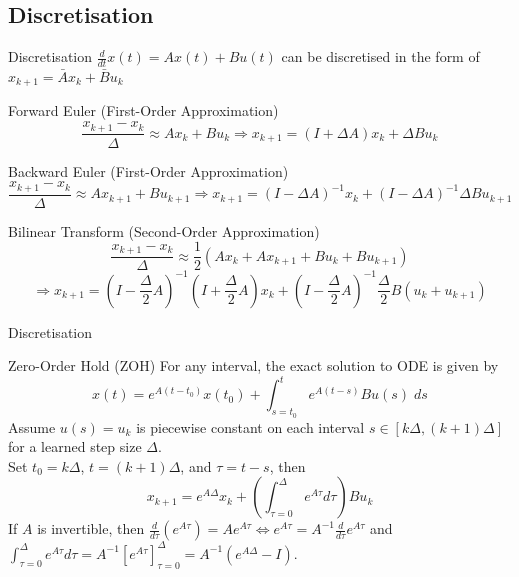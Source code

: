 \documentclass[xcolor=dvipsnames,aspectratio=169]{beamer}
\begin{document}
        \subsection{Discretisation}
            \begin{frame}{Discretisation}
                \small
                $\frac{d}{dt} x(t) = A x(t) + B u(t)$ can be discretised in the form of $x_{k + 1} = \bar{A} x_{k} + \bar{B} u_{k}$

                \begin{block}{Forward Euler (First-Order Approximation)} 
                    $$\frac{x_{k + 1} - x_{k}}{\Delta} \approx A x_{k} + B u_{k} \Rightarrow x_{k + 1} = (I + \Delta A) x_{k} + \Delta B u_{k}$$
                \end{block}

                \begin{block}{Backward Euler (First-Order Approximation)}
                    $$\frac{x_{k + 1} - x_{k}}{\Delta} \approx A x_{k + 1} + B u_{k + 1} \Rightarrow x_{k + 1} = (I - \Delta A)^{-1} x_{k} + (I - \Delta A)^{-1} \Delta B u_{k + 1}$$
                \end{block}

                \begin{block}{Bilinear Transform (Second-Order Approximation)} 
                    $$\frac{x_{k + 1} - x_{k}}{\Delta} \approx \frac{1}{2} (A x_{k} + A x_{k + 1} + B u_{k} + B u_{k + 1})$$
                    $$\Rightarrow x_{k+1} = (I - \frac{\Delta}{2} A)^{-1}(I + \frac{\Delta}{2} A) x_{k} + (I - \frac{\Delta}{2} A)^{-1} \frac{\Delta}{2} B (u_{k} + u_{k + 1})$$
                \end{block}
            \end{frame}

            \begin{frame}{Discretisation}
                \begin{block}{Zero-Order Hold (ZOH)}
                    For any interval, the exact solution to ODE is given by 
                    $$x(t) = e^{A (t - t_{0})} x(t_{0}) + \int_{s = t_{0}}^{t} e^{A(t - s)} B u(s) \; ds$$
                    Assume $u(s) = u_{k}$ is piecewise constant on each interval $s \in [k \Delta, (k + 1) \Delta]$ for a learned step size $\Delta$. \\
                    Set $t_{0} = k \Delta$, $t = (k + 1) \Delta$, and $\tau = t - s$, then 
                    $$x_{k + 1} = e^{A \Delta} x_{k} + (\int_{\tau = 0}^{\Delta} e^{A \tau} d \tau) B u_{k}$$
                    If $A$ is invertible, then $\frac{d}{d \tau} (e^{A \tau}) = A e^{A \tau} \iff e^{A \tau} = A^{-1} \frac{d}{d \tau} e^{A \tau}$ and $\int_{\tau = 0}^{\Delta} e^{A \tau} d \tau = A^{-1} [e^{A \tau}]_{\tau=0}^{\Delta} = A^{-1} (e^{A \Delta} - I)$.
                \end{block}
            \end{frame}
\end{document}
